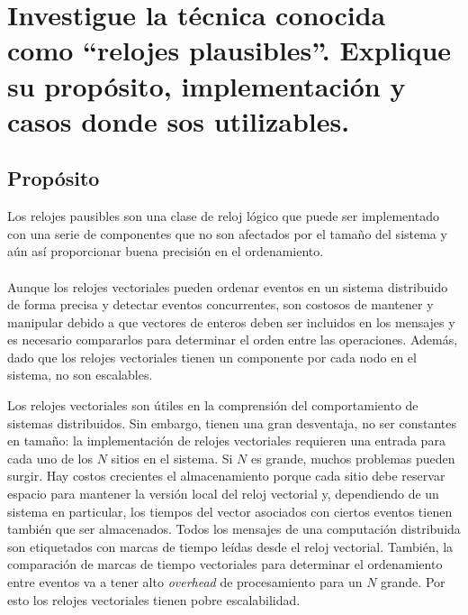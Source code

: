 \documentclass[12pt, times]{simauth}
\begin{document}
\section{Investigue la técnica conocida como ``relojes plausibles''. Explique su propósito, implementación y casos donde sos utilizables.}

\subsection{Propósito}
Los relojes pausibles son una clase de reloj lógico que puede ser implementado con una serie de componentes que no son afectados por el tamaño del sistema y aún así proporcionar buena precisión en el ordenamiento.

\paragraph{}Aunque los relojes vectoriales pueden ordenar eventos en un sistema distribuido de forma precisa y detectar eventos concurrentes, son costosos de mantener y manipular debido a que vectores de enteros deben ser incluidos en los mensajes y es necesario compararlos para determinar el orden entre las operaciones. Además, dado que los relojes vectoriales tienen un componente por cada nodo en el sistema, no son escalables. 

Los relojes vectoriales son útiles en la comprensión del comportamiento de sistemas distribuidos. Sin embargo, tienen una gran desventaja, no ser constantes en tamaño: la implementación de relojes vectoriales requieren una entrada para cada uno de los $N$ sitios en el sistema. Si $N$ es grande, muchos problemas pueden surgir. Hay costos crecientes el almacenamiento porque cada sitio debe reservar espacio para mantener la versión local del reloj vectorial y, dependiendo de un sistema en particular, los tiempos del vector asociados con ciertos eventos tienen también que ser almacenados. Todos los mensajes de una computación distribuida son etiquetados con marcas de tiempo leídas desde el reloj vectorial. También, la comparación de marcas de tiempo vectoriales para determinar el ordenamiento entre eventos va a tener alto \emph{overhead} de procesamiento para un $N$ grande. Por esto los relojes vectoriales tienen pobre escalabilidad.
\end{document}
